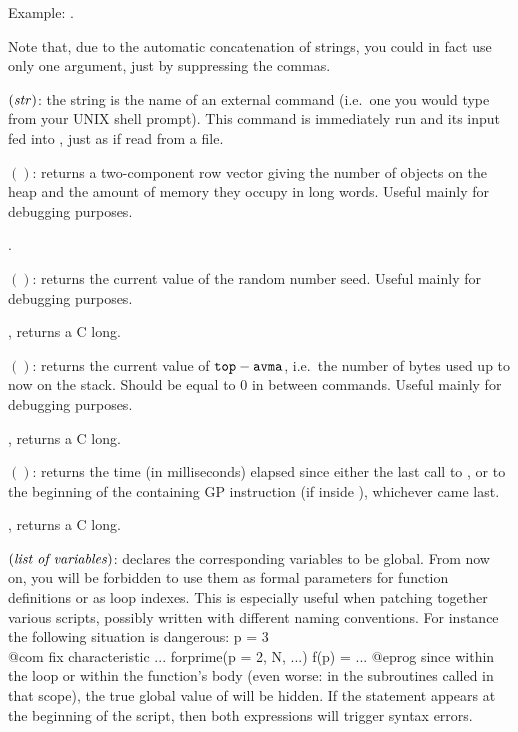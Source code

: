 Example: .

Note that, due to the automatic concatenation of strings, you could in fact
use only one argument, just by suppressing the commas.

$(\hbox{\it str\/})$: the string  is the name
of an external command (i.e.~one you would type from your UNIX shell prompt).
This command is immediately run and its input fed into , just as if read
from a file.

$()$: returns a two-component row vector giving the
number of objects on the heap and the amount of memory they occupy in long
words. Useful mainly for debugging purposes.

.

$()$: returns the current value of the random number
seed. Useful mainly for debugging purposes.

, returns a C long.

$()$: returns the current value of
${\tt top}-{\tt avma}$, i.e.~the number of bytes used up to now on the stack.
Should be equal to $0$ in between commands. Useful mainly for debugging
purposes.

, returns a C long.

$()$: returns the time (in milliseconds) elapsed since
either the last call to , or to the beginning of the containing
GP instruction (if inside ), whichever came last.

, returns a C long.

$(\hbox{\it list of variables\/})$: \label{se:global}
declares the corresponding variables to be global. From now on, you will be
forbidden to use them as formal parameters for function definitions or as
loop indexes. This is especially useful when patching together various
scripts, possibly written with different naming conventions. For instance the
following situation is dangerous:
%
\bprog
p = 3   \\@com fix characteristic
...
forprime(p = 2, N, ...)
f(p) = ...
@eprog
since within the loop or within the function's body (even worse: in the
subroutines called in that scope), the true global value of  will be
hidden. If the statement  appears at the beginning of
the script, then both expressions will trigger syntax errors.

